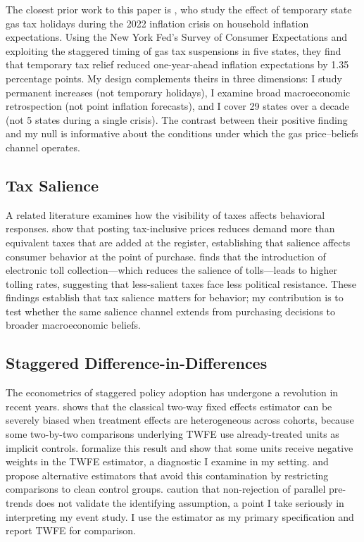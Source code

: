\documentclass[12pt]{article}
\begin{document}
The closest prior work to this paper is \citet{jo2025fueling}, who study the effect of temporary state gas tax holidays during the 2022 inflation crisis on household inflation expectations. Using the New York Fed's Survey of Consumer Expectations and exploiting the staggered timing of gas tax suspensions in five states, they find that temporary tax relief reduced one-year-ahead inflation expectations by 1.35 percentage points. My design complements theirs in three dimensions: I study permanent increases (not temporary holidays), I examine broad macroeconomic retrospection (not point inflation forecasts), and I cover 29 states over a decade (not 5 states during a single crisis). The contrast between their positive finding and my null is informative about the conditions under which the gas price--beliefs channel operates.

\subsection{Tax Salience}

A related literature examines how the visibility of taxes affects behavioral responses. \citet{chetty2009salience} show that posting tax-inclusive prices reduces demand more than equivalent taxes that are added at the register, establishing that salience affects consumer behavior at the point of purchase. \citet{finkelstein2009eztax} finds that the introduction of electronic toll collection---which reduces the salience of tolls---leads to higher tolling rates, suggesting that less-salient taxes face less political resistance. These findings establish that tax salience matters for behavior; my contribution is to test whether the same salience channel extends from purchasing decisions to broader macroeconomic beliefs.

\subsection{Staggered Difference-in-Differences}

The econometrics of staggered policy adoption has undergone a revolution in recent years. \citet{goodman2021difference} shows that the classical two-way fixed effects estimator can be severely biased when treatment effects are heterogeneous across cohorts, because some two-by-two comparisons underlying TWFE use already-treated units as implicit controls. \citet{dechaisemartin2020two} formalize this result and show that some units receive negative weights in the TWFE estimator, a diagnostic I examine in my setting. \citet{sun2021estimating} and \citet{callaway2021difference} propose alternative estimators that avoid this contamination by restricting comparisons to clean control groups. \citet{roth2023pretrends} caution that non-rejection of parallel pre-trends does not validate the identifying assumption, a point I take seriously in interpreting my event study. I use the \citet{callaway2021difference} estimator as my primary specification and report TWFE for comparison.
\end{document}
